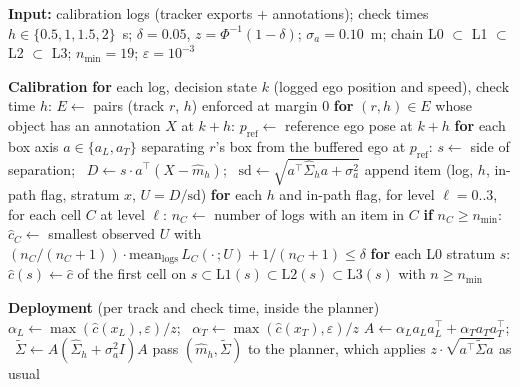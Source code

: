 \documentclass{ieeeaccess}
\newcommand{\AlgInd}{\hspace*{1.2em}}
\begin{document}
\begin{algorithm*}[!t]
\caption{M$^{*}$: calibration (offline) and deployment (online).}
\label{alg:1}
\begin{algorithmic}[1]
\item[] \textbf{Input:} calibration logs (tracker exports + annotations); check times $h \in \{0.5, 1, 1.5, 2\}$~s; $\delta = 0.05$, $z = \Phi^{-1}(1-\delta)$; $\sigma_a = 0.10$~m; chain L0 $\subset$ L1 $\subset$ L2 $\subset$ L3; $n_{\min} = 19$; $\varepsilon = 10^{-3}$
\item[] \textbf{Calibration}
\STATE \textbf{for} each log, decision state $k$ (logged ego position and speed), check time $h$:
\STATE \AlgInd $E \gets$ pairs (track $r$, $h$) enforced at margin 0 
\STATE \AlgInd \textbf{for} $(r, h) \in E$ whose object has an annotation $X$ at $k+h$:
\STATE \AlgInd\AlgInd $p_{\mathrm{ref}} \gets$ reference ego pose at $k+h$ 
\STATE \AlgInd\AlgInd \textbf{for} each box axis $a \in \{a_L, a_T\}$ separating $r$'s box from the buffered ego at $p_{\mathrm{ref}}$:
\STATE \AlgInd\AlgInd\AlgInd $s \gets$ side of separation; \ $D \gets s\cdot a^{\top}(X - \hat{m}_h)$; \ $\mathrm{sd} \gets \sqrt{a^{\top}\hat{\Sigma}_h a + \sigma_a^2}$
\STATE \AlgInd\AlgInd\AlgInd append item (log, $h$, in-path flag, stratum $x$, $U = D/\mathrm{sd}$)
\STATE \textbf{for} each $h$ and in-path flag, for level $\ell = 0..3$, for each cell $C$ at level $\ell$:
\STATE \AlgInd $n_C \gets$ number of logs with an item in $C$
\STATE \AlgInd \textbf{if} $n_C \geq n_{\min}$: $\hat{c}_C \gets$ smallest observed $U$ with $(n_C/(n_C+1))\cdot\mathrm{mean}_{\mathrm{logs}}\, L_C(\cdot\,; U) + 1/(n_C+1) \leq \delta$
\STATE \textbf{for} each L0 stratum $s$: $\hat{c}(s) \gets \hat{c}$ of the first cell on $s \subset \mathrm{L1}(s) \subset \mathrm{L2}(s) \subset \mathrm{L3}(s)$ with $n \geq n_{\min}$
\item[] \textbf{Deployment} (per track and check time, inside the planner)
\STATE $\alpha_L \gets \max(\hat{c}(x_L), \varepsilon)/z$; \ $\alpha_T \gets \max(\hat{c}(x_T), \varepsilon)/z$
\STATE $A \gets \alpha_L a_L a_L^{\top} + \alpha_T a_T a_T^{\top}$; \ $\tilde{\Sigma} \gets A(\hat{\Sigma}_h + \sigma_a^2 I)A$
\STATE pass $(\hat{m}_h, \tilde{\Sigma})$ to the planner, which applies $z\cdot\sqrt{a^{\top}\tilde{\Sigma}a}$ as usual
\end{algorithmic}
\end{algorithm*}
\end{document}
